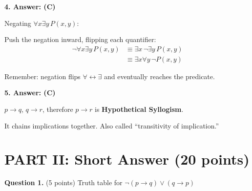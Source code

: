 \documentclass[11pt,a4paper]{article}
\begin{document}
\vspace{10pt}

\textbf{4. Answer: (C)}

\begin{solnbox}
Negating $\forall x \exists y\, P(x, y)$:

Push the negation inward, flipping each quantifier:
\begin{align*}
\neg \forall x \exists y\, P(x, y) &\equiv \exists x\, \neg \exists y\, P(x, y) \\
&\equiv \exists x \forall y\, \neg P(x, y)
\end{align*}

Remember: negation flips $\forall \leftrightarrow \exists$ and eventually reaches the predicate.
\end{solnbox}

\vspace{10pt}

\textbf{5. Answer: (C)}

\begin{solnbox}
$p \to q$, $q \to r$, therefore $p \to r$ is \textbf{Hypothetical Syllogism}.

It chains implications together. Also called ``transitivity of implication.''
\end{solnbox}

\newpage

\section*{PART II: Short Answer (20 points)}

\textbf{Question 1.} (5 points) Truth table for $\neg(p \to q) \lor (q \to p)$
\end{document}
